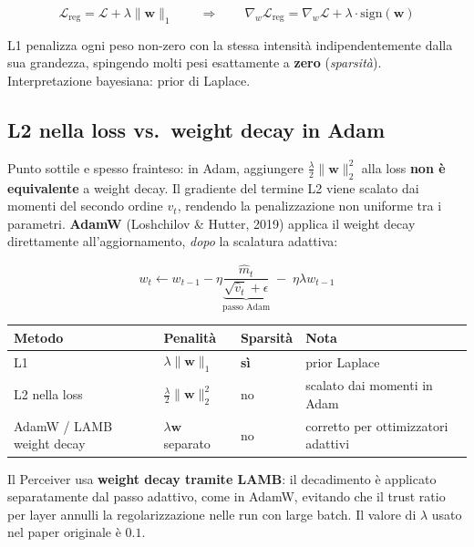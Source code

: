 \documentclass[
  11pt,
]{article}
\begin{document}
\begin{formulabox}[title={\textbf{L1 Regularization}}]
\[
\mathcal{L}_{\text{reg}} = \mathcal{L} + \lambda\|\mathbf{w}\|_1
\qquad \Rightarrow \qquad
\nabla_w \mathcal{L}_{\text{reg}} = \nabla_w \mathcal{L} + \lambda \cdot \text{sign}(\mathbf{w})
\]
\end{formulabox}

L1 penalizza ogni peso non-zero con la stessa intensità indipendentemente dalla sua grandezza, spingendo molti pesi esattamente a \textbf{zero} (\emph{sparsità}). Interpretazione bayesiana: prior di Laplace.

\subsection{L2 nella loss vs.\ weight decay in Adam}

Punto sottile e spesso frainteso: in Adam, aggiungere $\tfrac{\lambda}{2}\|\mathbf{w}\|_2^2$ alla loss \textbf{non è equivalente} a weight decay. Il gradiente del termine L2 viene scalato dai momenti del secondo ordine $v_t$, rendendo la penalizzazione non uniforme tra i parametri. \textbf{AdamW} (Loshchilov \& Hutter, 2019) applica il weight decay direttamente all'aggiornamento, \emph{dopo} la scalatura adattiva:

\[
w_t \leftarrow w_{t-1} - \eta \underbrace{\frac{\hat{m}_t}{\sqrt{\hat{v}_t} + \epsilon}}_{\text{passo Adam}} \;-\; \eta \lambda w_{t-1}
\]

\begin{center}
\begin{tabular}{llll}
\toprule
\textbf{Metodo} & \textbf{Penalità} & \textbf{Sparsità} & \textbf{Nota} \\
\midrule
L1 & $\lambda\|\mathbf{w}\|_1$ & \textbf{sì} & prior Laplace \\
L2 nella loss & $\tfrac{\lambda}{2}\|\mathbf{w}\|_2^2$ & no & scalato dai momenti in Adam \\
AdamW / LAMB weight decay & $\lambda \mathbf{w}$ separato & no & corretto per ottimizzatori adattivi \\
\bottomrule
\end{tabular}
\end{center}

\begin{notabox}[title={\textbf{Collegamento al Perceiver}}]
Il Perceiver usa \textbf{weight decay tramite LAMB}: il decadimento è applicato separatamente dal passo adattivo, come in AdamW, evitando che il trust ratio per layer annulli la regolarizzazione nelle run con large batch. Il valore di $\lambda$ usato nel paper originale è $0.1$.
\end{notabox}
\end{document}
